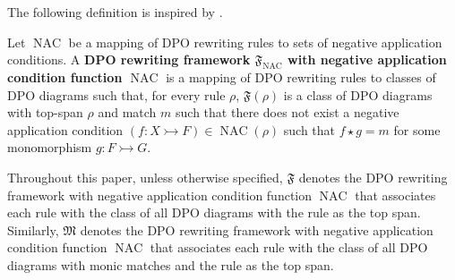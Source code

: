 The following definition is inspired by \cite{endrullis2024generalized}.
\begin{definition}
    Let $\operatorname{NAC}$ be a mapping of DPO rewriting rules to sets of negative application conditions.
    A \textbf{DPO rewriting framework $\mathfrak{F}_{\operatorname{NAC}}$ with negative application condition function $\operatorname{NAC}$} is a mapping of DPO rewriting rules to classes of DPO diagrams such that, for every rule $\rho$, $\mathfrak{F}(\rho)$ is a class of DPO diagrams with top-span $\rho$ and match $m$ such that there does not exist a negative application condition $(f:X \rightarrowtail F) \in \operatorname{NAC}(\rho)$ such that $f \star g = m$ for some monomorphism $g: F \rightarrowtail G$.
\end{definition}
Throughout this paper, unless otherwise specified, 
\(\mathfrak{F}\) denotes the DPO rewriting framework with negative application condition function $\operatorname{NAC}$ that associates each rule with the class of all DPO diagrams with the rule as the top span. Similarly, \(\mathfrak{M}\) denotes the DPO rewriting framework with negative application condition function $\operatorname{NAC}$ that associates each rule with the class of all DPO diagrams with monic matches and the rule as the top span.